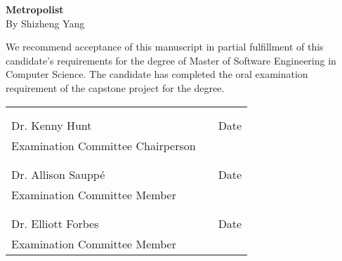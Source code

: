 \thispagestyle{empty}
\vspace*{0.3in}
\begin{center}
	\large{\textbf{Metropolist}} \\
	\vspace{0.75in}
	\normalsize{By Shizheng Yang}
\end{center}

\vspace{0.5in}
\noindent We recommend acceptance of this manuscript in partial fulfillment of this candidate's requirements for the degree of Master of Software Engineering in Computer Science. The candidate has completed the oral examination requirement of the capstone project for the degree. \\

\noindent
\begin{tabularx}{\textwidth}{p{3in}Xp{2in}}
	\rule{0pt}{50pt} & & \\
	\hrulefill & & \hrulefill \\
	Dr. Kenny Hunt & & Date \\
	Examination Committee Chairperson & & \\
	\rule{0pt}{50pt} & & \\
	\hrulefill & & \hrulefill \\
	Dr. Allison Sauppé & & Date \\
	Examination Committee Member & & \\
	\rule{0pt}{50pt} & & \\
	\hrulefill & & \hrulefill \\
	Dr. Elliott Forbes & & Date \\
	Examination Committee Member & & \\
\end{tabularx}
